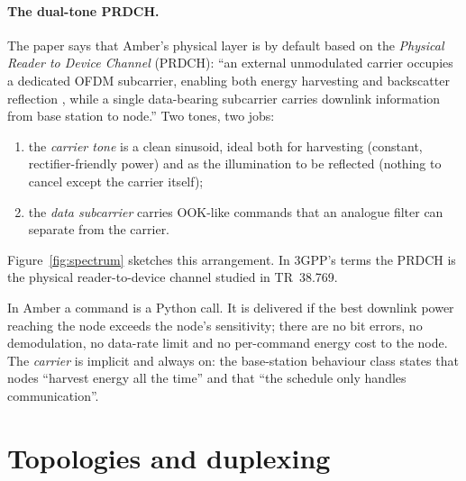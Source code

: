 \paragraph{The dual-tone PRDCH.}
The paper says that Amber's physical layer is by default based on the
\emph{Physical Reader to Device Channel} (PRDCH): ``an external unmodulated
carrier occupies a dedicated OFDM subcarrier, enabling both energy harvesting
and backscatter reflection \citep{zhu2022ofdma}, while a single data-bearing
subcarrier carries downlink information from base station to node.'' Two tones,
two jobs:
\begin{enumerate}
 \item the \emph{carrier tone} is a clean sinusoid, ideal both for harvesting
   (constant, rectifier-friendly power) and as the illumination to be reflected
   (nothing to cancel except the carrier itself);
 \item the \emph{data subcarrier} carries OOK-like commands that an analogue
   filter can separate from the carrier.
\end{enumerate}
Figure~\ref{fig:spectrum} sketches this arrangement. In 3GPP's terms the
PRDCH is the physical reader-to-device channel studied in TR~38.769.

\begin{reality}
In Amber a command is a Python call. It is delivered if the best downlink
power reaching the node exceeds the node's sensitivity; there are no bit errors,
no demodulation, no data-rate limit and no per-command energy cost to the
node. The \emph{carrier} is implicit and always on: the base-station behaviour
class states that nodes ``harvest energy all the time'' and that ``the schedule
only handles communication''.
\end{reality}

\section{Topologies and duplexing}

